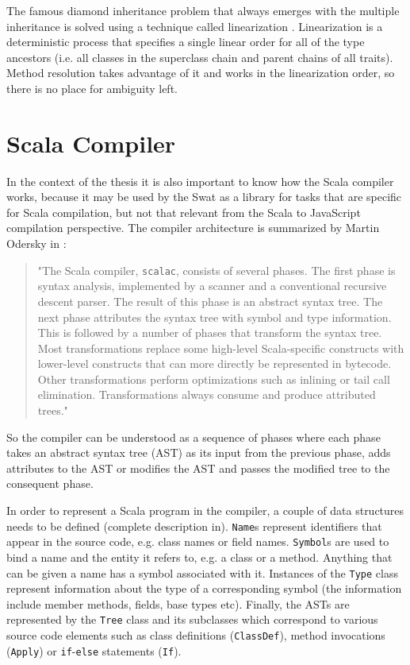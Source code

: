 \documentclass[12pt,a4paper]{report}
\begin{document}
The famous diamond inheritance problem that always emerges with the multiple inheritance is solved using a technique called linearization \cite{Linearization}. Linearization is a deterministic process that specifies a single linear order for all of the type ancestors (i.e. all classes in the superclass chain and parent chains of all traits). Method resolution takes advantage of it and works in the linearization order, so there is no place for ambiguity left.

\section{Scala Compiler}
\label{sec:ScalaCompiler}

In the context of the thesis it is also important to know how the Scala compiler works, because it may be used by the Swat as a library for tasks that are specific for Scala compilation, but not that relevant from the Scala to JavaScript compilation perspective. The compiler architecture is summarized by Martin Odersky in  \cite{ScalableComponents}:

\begin{quote}
"The Scala compiler, \texttt{scalac}, consists of several phases. The first phase is syntax analysis, implemented by a scanner and a conventional recursive descent parser. The result of this phase is an abstract syntax tree. The next phase attributes the syntax tree with symbol and type information. This is followed by a number of phases that transform the syntax tree. Most transformations replace some high-level Scala-specific constructs with lower-level constructs that can more directly be represented in bytecode. Other transformations perform optimizations such as inlining or tail call elimination. Transformations always consume and produce attributed trees."
\end{quote}

So the compiler can be understood as a sequence of phases where each phase takes an abstract syntax tree (AST) as its input from the previous phase, adds attributes to the AST or modifies the AST and passes the modified tree to the consequent phase.

In order to represent a Scala program in the compiler, a couple of data structures needs to be defined (complete description in\cite{Reflection}). \texttt{Name}s represent identifiers that appear in the source code, e.g. class names or field names. \texttt{Symbol}s are used to bind a name and the entity it refers to, e.g. a class or a method. Anything that can be given a name has a symbol associated with it. Instances of the \texttt{Type} class represent information about the type of a corresponding symbol (the information include member methods, fields, base types etc). Finally, the ASTs are represented by the \texttt{Tree} class and its subclasses which correspond to various source code elements such as class definitions (\texttt{ClassDef}), method invocations (\texttt{Apply}) or \texttt{if}-\texttt{else} statements (\texttt{If}).
\end{document}
